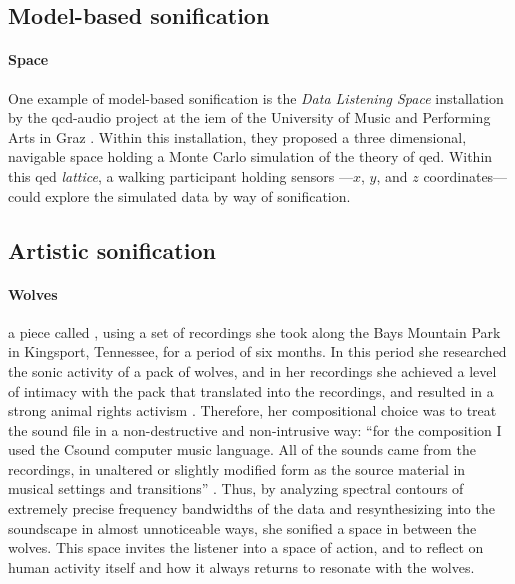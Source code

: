 \subsection{Model-based sonification}
\label{sonification:model}

\paragraph{Space}
One example of model-based sonification is the \textit{Data Listening Space} installation by the \gls{qcd-audio} project at the \gls{iem} of the University of Music and Performing Arts in Graz \parencite{icmc/bbp2372.2012.096}. Within this installation, they proposed a three dimensional, navigable space holding a Monte Carlo simulation of the theory of \gls{qed}. Within this \gls{qed} \textit{lattice}, a walking participant holding sensors ---$x$, $y$, and $z$ coordinates--- could explore the simulated data by way of sonification.

\subsection{Artistic sonification}
\label{sonification:artistic}

\paragraph{Wolves}
\textcite{Kle98:The} a piece called , using a set of recordings she took along the Bays Mountain Park in Kingsport, Tennessee, for a period of six months. In this period she researched the sonic activity of a pack of wolves, and in her recordings she achieved a level of intimacy with the pack that translated into the recordings, and resulted in a strong animal rights activism \parencite{Kle17:Lec}. Therefore, her compositional choice was to treat the sound file in a non-destructive and non-intrusive way: ``for the composition I used the Csound computer music language. All of the sounds came from the recordings, in unaltered or slightly modified form as the source material in musical settings and transitions'' \parencite{Kle98:The}. Thus, by analyzing spectral contours of extremely precise frequency bandwidths of the data and resynthesizing into the soundscape in almost unnoticeable ways, she sonified a space in between the wolves. This space invites the listener into a space of action, and to reflect on human activity itself and how it always returns to resonate with the wolves.

